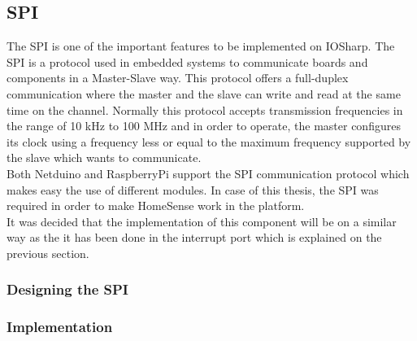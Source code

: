 \subsection{SPI}\label{SS:IOSharp-SPI}
The \gls{SPI} is one of the important features to be implemented on IOSharp. The SPI is a protocol used in embedded systems to communicate boards and components in a Master-Slave way. This protocol offers a full-duplex communication where the master and the slave can write and read at the same time on the channel. Normally this protocol accepts transmission frequencies in the range of 10 kHz to 100 MHz and in order to operate, the master configures its clock using a frequency less or equal to the maximum frequency supported by the slave which wants to communicate.
\\
Both Netduino and RaspberryPi support the SPI communication protocol which makes easy the use of different modules. In case of this thesis, the SPI was required in order to make HomeSense work in the platform.
\\
It was decided that the implementation of this component will be on a similar way as the it has been done in the interrupt port which is explained on the previous section.

\subsubsection{Designing the SPI}\label{SSS:IOSharp-SPI-Design}

\subsubsection{Implementation}\label{SSS:IOSharp-SPI-Implementation}

